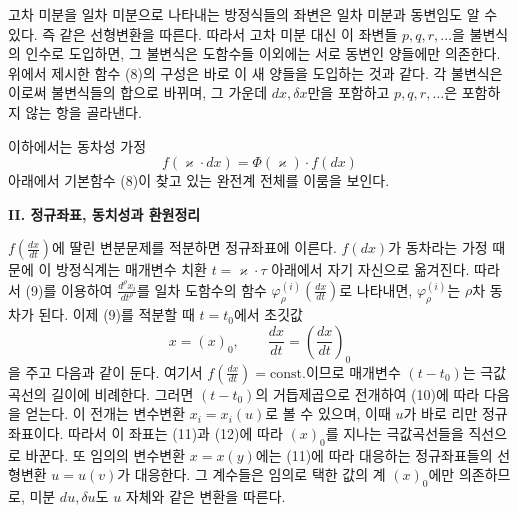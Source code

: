 고차 미분을 일차 미분으로 나타내는 방정식들의 좌변은 일차 미분과 동변임도 알 수 있다. 즉 같은 선형변환을 따른다. 따라서 고차 미분 대신 이 좌변들 \(p,q,r,\ldots\)을 불변식의 인수로 도입하면, 그 불변식은 도함수들 이외에는 서로 동변인 양들에만 의존한다. 위에서 제시한 함수 (8)의 구성은 바로 이 새 양들을 도입하는 것과 같다. 각 불변식은 이로써 불변식들의 합으로 바뀌며, 그 가운데 \(dx,\delta x\)만을 포함하고 \(p,q,r,\ldots\)은 포함하지 않는 항을 골라낸다.

이하에서는 동차성 가정
\[
f(\varkappa\cdot dx)=\Phi(\varkappa)\cdot f(dx)
\]
아래에서 기본함수 (8)이 찾고 있는 완전계 전체를 이룸을 보인다.

\begin{center}
\textbf{II. 정규좌표, 동치성과 환원정리}
\end{center}

\(f\!\left(\frac{dx}{dt}\right)\)에 딸린 변분문제를 적분하면 정규좌표에 이른다.
\(f(dx)\)가 동차라는 가정 때문에 이 방정식계는 매개변수 치환 \(t=\varkappa\cdot\tau\) 아래에서 자기 자신으로 옮겨진다. 따라서 (9)를 이용하여
\(\frac{d^\rho x_i}{dt^\rho}\)를 일차 도함수의 함수
\(\varphi_\rho^{(i)}\!\left(\frac{dx}{dt}\right)\)로 나타내면,
\(\varphi_\rho^{(i)}\)는 \(\rho\)차 동차가 된다.
이제 (9)를 적분할 때 \(t=t_0\)에서 초깃값
\[
x=(x)_0,\qquad \frac{dx}{dt}=\left(\frac{dx}{dt}\right)_0
\]
을 주고 다음과 같이 둔다.
여기서 \(f\!\left(\frac{dx}{dt}\right)=\mathrm{const.}\)이므로 매개변수 \((t-t_0)\)는 \glqq{}극값곡선의 길이\grqq{}에 비례한다. 그러면 \((t-t_0)\)의 거듭제곱으로 전개하여 (10)에 따라 다음을 얻는다.
이 전개는 변수변환 \(x_i=x_i(u)\)로 볼 수 있으며, 이때 \(u\)가 바로 리만 정규좌표이다. 따라서 이 좌표는 (11)과 (12)에 따라 \((x)_0\)를 지나는 극값곡선들을 직선으로 바꾼다. 또 임의의 변수변환 \(x=x(y)\)에는 (11)에 따라 대응하는 정규좌표들의 선형변환 \(u=u(v)\)가 대응한다. 그 계수들은 임의로 택한 값의 계 \((x)_0\)에만 의존하므로, 미분 \(du,\delta u\)도 \(u\) 자체와 같은 변환을 따른다.

